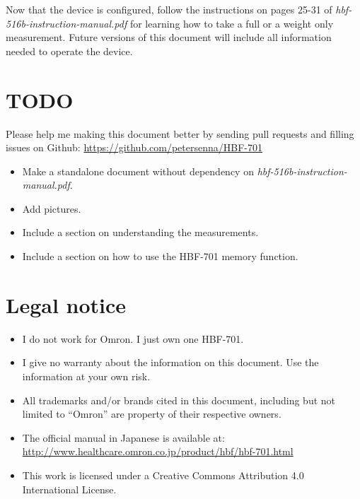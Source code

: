 \documentclass[10pt]{article}
\begin{document}
Now that the device is configured, follow the instructions on pages 25-31 of
\textit{hbf-516b-instruction-manual.pdf} for learning how to take a full or a
weight only measurement. Future versions of this document will include all
information needed to operate the device.

\section{TODO}
\label{sec:todo}
Please help me making this document better by sending pull requests and filling
issues on Github: \url{https://github.com/petersenna/HBF-701}
\begin{itemize}
  \item Make a standalone document without dependency on
	\textit{hbf-516b-instruction-manual.pdf}.
  \item Add pictures.
  \item Include a section on understanding the measurements.
  \item Include a section on how to use the HBF-701 memory function.
\end{itemize}

\section{Legal notice}
\label{sec:legal}
\begin{itemize}
  \item I do not work for Omron. I just own one HBF-701.
  \item I give no warranty about the information on this document. Use the
	information at your own risk.
  \item All trademarks and/or brands cited in this document, including but not
        limited to ``Omron'' are property of their respective owners.
  \item The official manual in Japanese is available at:
        \url{http://www.healthcare.omron.co.jp/product/hbf/hbf-701.html}
  \item This work is licensed under a Creative Commons Attribution 4.0
        International License.
\end{itemize}
\end{document}
